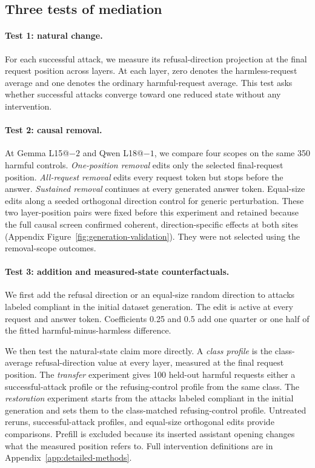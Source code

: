 \documentclass{article}
\begin{document}
\subsection{Three tests of mediation}
\label{sec:tests}

\paragraph{Test 1: natural change.}
For each successful attack, we measure its refusal-direction projection at the final request position across layers. At each layer, zero denotes the harmless-request average and one denotes the ordinary harmful-request average. This test asks whether successful attacks converge toward one reduced state without any intervention.

\paragraph{Test 2: causal removal.}
At Gemma L15@$-2$ and Qwen L18@$-1$, we compare four scopes on the same 350 harmful controls. \emph{One-position removal} edits only the selected final-request position. \emph{All-request removal} edits every request token but stops before the answer. \emph{Sustained removal} continues at every generated answer token. Equal-size edits along a seeded orthogonal direction control for generic perturbation. These two layer-position pairs were fixed before this experiment and retained because the full causal screen confirmed coherent, direction-specific effects at both sites (Appendix Figure~\ref{fig:generation-validation}). They were not selected using the removal-scope outcomes.

\paragraph{Test 3: addition and measured-state counterfactuals.}
We first add the refusal direction or an equal-size random direction to attacks labeled compliant in the initial dataset generation. The edit is active at every request and answer token. Coefficients 0.25 and 0.5 add one quarter or one half of the fitted harmful-minus-harmless difference.

We then test the natural-state claim more directly. A \emph{class profile} is the class-average refusal-direction value at every layer, measured at the final request position. The \emph{transfer} experiment gives 100 held-out harmful requests either a successful-attack profile or the refusing-control profile from the same class. The \emph{restoration} experiment starts from the attacks labeled compliant in the initial generation and sets them to the class-matched refusing-control profile. Untreated reruns, successful-attack profiles, and equal-size orthogonal edits provide comparisons. Prefill is excluded because its inserted assistant opening changes what the measured position refers to. Full intervention definitions are in Appendix~\ref{app:detailed-methods}.
\end{document}
